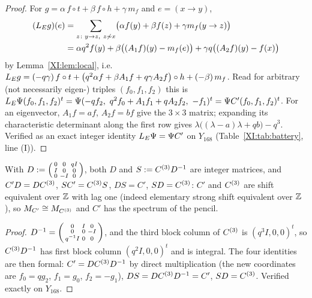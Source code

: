 \begin{proof}
For $g=\alpha\,f\circ t+\beta\,f\circ h+\gamma\,m_f$ and $e=(x\to y)$,
\begin{align*}
(L_E g)(e)&=\sum_{z\colon y\to z,\ z\not\sim x}\bigl(\alpha f(y)+\beta f(z)+\gamma m_f(y\to z)\bigr)\\
&=\alpha q^{2}f(y)+\beta\bigl((A_1f)(y)-m_f(e)\bigr)+\gamma q\bigl((A_2f)(y)-f(x)\bigr)
\end{align*}
by Lemma~\ref{XI:lem:local}, i.e.\ $L_E g=(-q\gamma)\,f\circ t+\bigl(q^{2}\alpha f+\beta A_1f
+q\gamma A_2f\bigr)\circ h+(-\beta)\,m_f$. Read for arbitrary (not necessarily eigen-)
triples $(f_0,f_1,f_2)$ this is $\LE\Psi(f_0,f_1,f_2)^{t}=\Psi(-qf_2,\ q^{2}f_0+A_1f_1+qA_2f_2,
\ -f_1)^{t}=\Psi C'(f_0,f_1,f_2)^{t}$. For an eigenvector, $A_1f=af$, $A_2f=bf$ give the
$3\times3$ matrix; expanding its characteristic determinant along the first row gives
$\lambda\bigl((\lambda-a)\lambda+qb\bigr)-q^{3}$. Verified as an exact integer identity
$L_E\Psi=\Psi C'$ on $Y_{168}$ (Table~\ref{XI:tab:battery}, line (I)).
\end{proof}

\begin{proposition}\label{XI:prop:Cprime}
With $D:=\begin{psmallmatrix}0&0&qI\\ I&0&0\\0&-I&0\end{psmallmatrix}$, both $D$ and
$S:=C^{(3)} D^{-1}$ are integer matrices, and $C'D=DC^{(3)}$, $S C'=C^{(3)} S$, $DS=C'$,
$SD=C^{(3)}$: $C'$ and $C^{(3)}$ are shift equivalent over $\mathbb{Z}$ with lag one (indeed
elementary strong shift equivalent over $\mathbb{Z}$), so $M_{C'}\cong M_{C^{(3)}}$ and $C'$ has the
spectrum of the pencil.
\end{proposition}

\begin{proof}
$D^{-1}=\begin{psmallmatrix}0&I&0\\0&0&-I\\ q^{-1}I&0&0\end{psmallmatrix}$, and the third block
column of $C^{(3)}$ is $(q^{3}I,0,0)^{t}$, so $C^{(3)} D^{-1}$ has first block column
$(q^{2}I,0,0)^{t}$ and is integral. The four identities are then formal:
$C'=DC^{(3)} D^{-1}$ by direct multiplication (the new coordinates are $f_0=qg_2$, $f_1=g_0$,
$f_2=-g_1$), $DS=DC^{(3)} D^{-1}=C'$, $SD=C^{(3)}$. Verified exactly on $Y_{168}$.
\end{proof}

